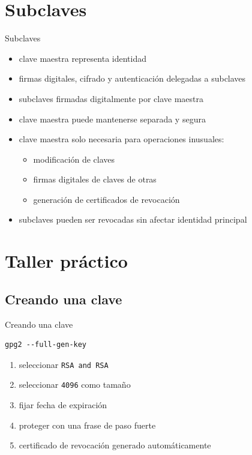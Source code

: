 \documentclass{beamer}
\begin{document}
\section{Subclaves}
\begin{frame}{Subclaves}
\begin{itemize}
    \item clave maestra representa identidad
    \item firmas digitales, cifrado y autenticación delegadas a subclaves
    \item subclaves firmadas digitalmente por clave maestra
    \item clave maestra puede mantenerse separada y segura
    \item clave maestra solo necesaria para operaciones inusuales:
        \begin{itemize}
            \item modificación de claves
            \item firmas digitales de claves de otras
            \item generación de certificados de revocación
        \end{itemize}
    \item subclaves pueden ser revocadas sin afectar identidad principal
\end{itemize}
\end{frame}


\section{Taller práctico}


\subsection{Creando una clave}
\begin{frame}[fragile]{Creando una clave}
\begin{lstlisting}
gpg2 --full-gen-key
\end{lstlisting}
\begin{enumerate}
    \item seleccionar \texttt{RSA and RSA}
    \item seleccionar \texttt{4096} como tamaño
    \item fijar fecha de expiración
    \item proteger con una frase de paso fuerte
    \item certificado de revocación generado automáticamente
\end{enumerate}
\end{frame}
\end{document}
